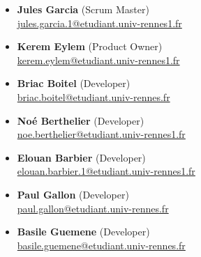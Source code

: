 \documentclass[11pt,a4paper]{article}
\begin{document}
\begin{itemize}
  \item \textbf{Jules Garcia} (Scrum Master)  \\
  \href{mailto:jules.garcia.1@etudiant.univ-rennes1.fr}{jules.garcia.1@etudiant.univ-rennes1.fr}
  \item \textbf{Kerem Eylem} (Product Owner)  \\
  \href{mailto:kerem.eylem@etudiant.univ-rennes1.fr}{kerem.eylem@etudiant.univ-rennes1.fr}
  \item \textbf{Briac Boitel} (Developer)  \\
  \href{mailto:briac.boitel@etudiant.univ-rennes.fr}{briac.boitel@etudiant.univ-rennes.fr}
  \item \textbf{No\'e Berthelier} (Developer)  \\
  \href{mailto:noe.berthelier@etudiant.univ-rennes1.fr}{noe.berthelier@etudiant.univ-rennes1.fr}
  \item \textbf{Elouan Barbier} (Developer)  \\
  \href{mailto:elouan.barbier.1@etudiant.univ-rennes1.fr}{elouan.barbier.1@etudiant.univ-rennes1.fr}
  \item \textbf{Paul Gallon} (Developer)  \\
  \href{mailto:paul.gallon@etudiant.univ-rennes.fr}{paul.gallon@etudiant.univ-rennes.fr}
  \item \textbf{Basile Guemene} (Developer)  \\
  \href{mailto:basile.guemene@etudiant.univ-rennes.fr}{basile.guemene@etudiant.univ-rennes.fr}
\end{itemize}
\end{document}
